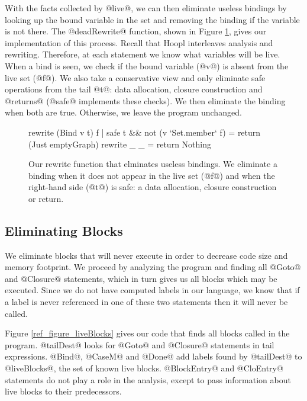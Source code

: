 \documentclass[12pt]{report}
\begin{document}
With the facts collected by @live@, we can then eliminate useless
bindings by looking up the bound variable in the set and removing the
binding if the variable is not there. The @deadRewrite@ function,
shown in Figure \ref{ref_fig_deadRewrite}, gives our implementation of
this process. Recall that Hoopl interleaves analysis and rewriting.
Therefore, at each statement we know what variables will be live. When
a bind is seen, we check if the bound variable (@v@) is absent from
the live set (@f@). We also take a conservative view and only
eliminate safe operations from the tail @t@: data allocation, closure
construction and @returns@ (@safe@ implements these checks). We then
eliminate the binding when both are true. Otherwise, we leave the
program unchanged.

\begin{figure}[h]
\begin{code}
rewrite (Bind v t) f 
  | safe t && not (v `Set.member` f) = return (Just emptyGraph)
rewrite _ _ = return Nothing
\end{code}
\caption{Our rewrite function that elminates useless bindings. We eliminate a
binding when it does not appear in the live set (@f@) and when the right-hand side
(@t@) is safe: a data allocation, closure construction or return.}
\label{ref_fig_deadRewrite}
\end{figure}

\subsection{Eliminating Blocks}

We eliminate blocks that will never execute in order to decrease code
size and memory footprint. We proceed by analyzing the program and
finding all @Goto@ and @Closure@ statements, which in turn gives us
all blocks which may be executed. Since we do not have computed
labels in our language, we know that if a label is never referenced in
one of these two statements then it will never be called.

Figure \ref{ref_figure_liveBlocks} gives our code that finds all
blocks called in the program. @tailDest@ looks for @Goto@ and
@Closure@ statements in tail expressions. @Bind@, @CaseM@ and @Done@
add labels found by @tailDest@ to @liveBlocks@, the set of known live
blocks. @BlockEntry@ and @CloEntry@ statements do not play a role in
the analysis, except to pass information about live blocks to their
predecessors.
\end{document}
